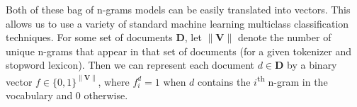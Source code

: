 Both of these bag of n-grams models can be easily translated into vectors. This allows us to use a variety of standard machine learning multiclass classification techniques. For some set of documents $\mathbf{D}$, let $\| \mathbf{V} \|$ denote the number of unique n-grams that appear in that set of documents (for a given tokenizer and stopword lexicon). Then we can represent each document $ d \in \mathbf{D}$ by a binary vector $f \in \{0,1\}^{\| \mathbf{V} \|}$, where $f^d_i = 1$ when $d$ contains the $i$\textsuperscript{th} n-gram in the vocabulary and 0 otherwise.


